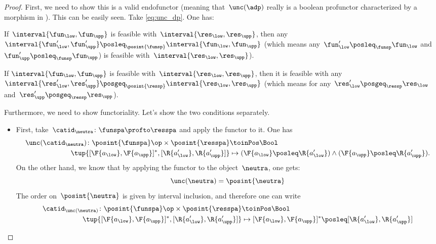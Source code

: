 \begin{proof}
First, we need to show this is a valid endofunctor (meaning that~$\unc(\adp)$ really is a boolean profunctor characterized by a morphism in \Pos).
This can be easily seen. Take \cref{eq:unc_dp}. One has:
\begin{compactitem}
\item If~$\interval{\fun_\low,\fun_\upp}$ is feasible with~$\interval{\res_\low,\res_\upp}$, then any~$\interval{\fun'_\low,\fun'_\upp}\posleq_{\posint{\funsp}}\interval{\fun_\low,\fun_\upp}$ (which means any~$\fun'_\low\posleq_{\funsp}\fun_\low$ and~$\fun'_\upp\posleq_{\funsp}\fun_\upp$) is feasible with~$\interval{\res_\low,\res_\upp}$).
\item If $\interval{\fun_\low,\fun_\upp}$ is feasible with~$\interval{\res_\low,\res_\upp}$, then it is feasible with any~$\interval{\res'_\low,\res'_\upp}\posgeq_{\posint{\ressp}} \interval{\res_\low,\res_\upp}$ (which means for any~$\res'_\low\posgeq_{\ressp} \res_\low$ and~$\res'_\upp \posgeq_{\ressp} \res_\upp$).
\end{compactitem}
Furthermore, we need to show functoriality. Let's show the two conditions separately.
\begin{itemize}
    \item First, take~$\catid_\neutra \colon \funspa\profto \resspa$ and apply the functor to it. One has
\begin{equation*}
\begin{aligned}
    \unc(\catid_\neutra)\colon \posint{\funspa}\op \times \posint{\resspa}&\toinPos \Bool\\
    \tup{[\F{a_\low},\F{a_\upp}]^*,[\R{a'_\low},\R{a'_\upp}]}&\mapsto (\F{a_\low}\posleq \R{a'_\low})\wedge (\F{a_\upp}\posleq \R{a'_\upp}).
\end{aligned}
\end{equation*}
On the other hand, we know that by applying the functor to the object~$\neutra$, one gets:
\begin{equation*}
      \unc(\neutra)=\posint{\neutra}
\end{equation*}
The order on~$\posint{\neutra}$ is given by interval inclusion, and therefore one can write
\begin{equation*}
    \begin{aligned}
      \catid_{\unc(\neutra)}\colon \posint{\funspa}\op \times \posint{\resspa}&\toinPos \Bool\\
      \tup{[\F{a_\low},\F{a_\upp}]^*,[\R{a'_\low},\R{a'_\upp}]}&\mapsto [\F{a_\low},\F{a_\upp}]^* \posleq [\R{a'_\low},\R{a'_\upp}]\\

\end{aligned}
\end{equation*}
\end{itemize}
\end{proof}
